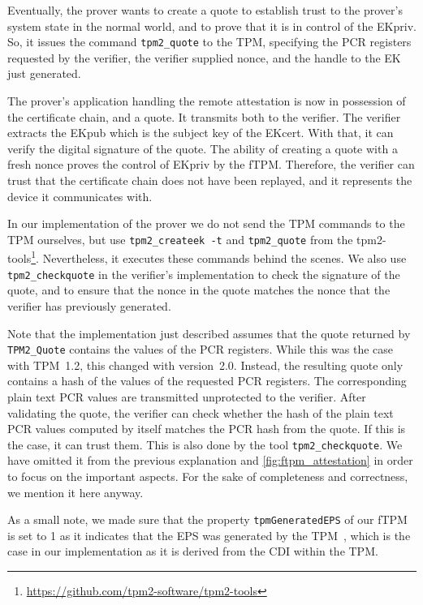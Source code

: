Eventually, the prover wants to create a quote to establish trust to the prover's system state in the normal world, and to prove that it is in control of the EKpriv.
So, it issues the command \texttt{tpm2\_quote} to the TPM, specifying the PCR registers requested by the verifier, the verifier supplied nonce, and the handle to the EK just generated.

The prover's application handling the remote attestation is now in possession of the certificate chain, and a quote.
It transmits both to the verifier.
The verifier extracts the EKpub which is the subject key of the EKcert.
With that, it can verify the digital signature of the quote.
The ability of creating a quote with a fresh nonce proves the control of EKpriv by the fTPM\@.
Therefore, the verifier can trust that the certificate chain does not have been replayed, and it represents the device it communicates with.

In our implementation of the prover we do not send the TPM commands to the TPM ourselves, but use \texttt{tpm2\_createek~-t} and \texttt{tpm2\_quote} from the tpm2-tools\footnote{\url{https://github.com/tpm2-software/tpm2-tools}}.
Nevertheless, it executes these commands behind the scenes.
We also use \texttt{tpm2\_checkquote} in the verifier's implementation to check the signature of the quote, and to ensure that the nonce in the quote matches the nonce that the verifier has previously generated.

Note that the implementation just described assumes that the quote returned by \texttt{TPM2\_Quote} contains the values of the PCR registers.
While this was the case with TPM~1.2, this changed with version~2.0.
Instead, the resulting quote only contains a hash of the values of the requested PCR registers.
The corresponding plain text PCR values are transmitted unprotected to the verifier.
After validating the quote, the verifier can check whether the hash of the plain text PCR values computed by itself matches the PCR hash from the quote.
If this is the case, it can trust them.
This is also done by the tool \texttt{tpm2\_checkquote}.
We have omitted it from the previous explanation and \autoref{fig:ftpm_attestation} in order to focus on the important aspects.
For the sake of completeness and correctness, we mention it here anyway.

As a small note, we made sure that the property \texttt{tpmGeneratedEPS} of our fTPM is set to 1 as it indicates that the EPS was generated by the TPM~\cite{tpm}, which is the case in our implementation as it is derived from the CDI within the TPM\@.



